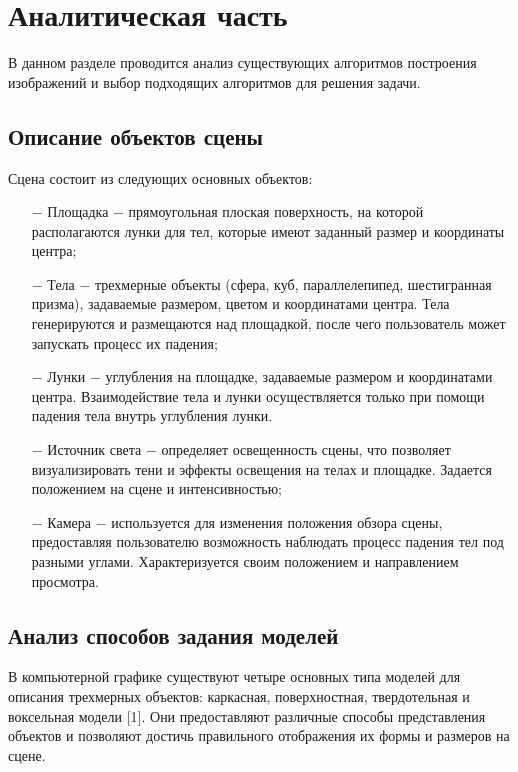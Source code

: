 \chapter{Аналитическая часть}

В данном разделе проводится анализ существующих алгоритмов построения изображений и выбор подходящих алгоритмов для решения задачи.

\section{Описание объектов сцены}

Сцена состоит из следующих основных объектов:

\begin{itemize}
	\item[$-$] Площадка $-$ прямоугольная плоская поверхность, на которой располагаются лунки для тел, которые имеют заданный размер и координаты центра;
    \item[$-$] Тела $-$ трехмерные объекты (сфера, куб, параллелепипед, шестигранная призма), задаваемые размером, цветом и координатами центра. Тела генерируются и размещаются над площадкой, после чего пользователь может запускать процесс их падения;
    \item[$-$] Лунки $-$ углубления на площадке, задаваемые размером и координатами центра. Взаимодействие тела и лунки осуществляется только при помощи падения тела внутрь углубления лунки.   
    \item[$-$] Источник света $-$ определяет освещенность сцены, что позволяет визуализировать тени и эффекты освещения на телах и площадке. Задается положением на сцене и интенсивностью;
    \item[$-$] Камера $-$ используется для изменения положения обзора сцены, предоставляя пользователю возможность наблюдать процесс падения тел под разными углами. Характеризуется своим положением и направлением просмотра.
\end{itemize}

\section{Анализ способов задания моделей}

В компьютерной графике существуют четыре основных типа моделей для
описания трехмерных объектов: каркасная, поверхностная, твердотельная
и воксельная модели [1]. Они предоставляют различные способы представления объектов и
позволяют достичь правильного отображения их формы и размеров на сцене.

